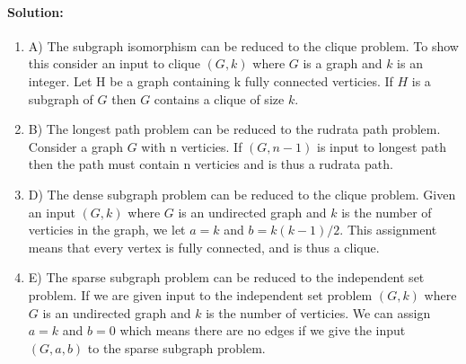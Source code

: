 \documentclass[12pt]{article}
\begin{document}
\paragraph{Solution:}
\begin{enumerate}

\item A) The subgraph isomorphism can be reduced to the clique problem.  To show
this consider an input to clique $(G,k)$ where $G$ is a graph and $k$ is an integer.
Let H be a graph containing k fully connected verticies.  If $H$ is a subgraph of
$G$ then $G$ contains a clique of size $k$.

\item B) The longest path problem can be reduced to the rudrata path problem.
Consider a graph $G$ with n verticies. If $(G,n-1)$ is input to longest path then
the path must contain n verticies and is thus a rudrata path.

\item D) The dense subgraph problem can be reduced to the clique problem. Given
an input $(G,k)$ where $G$ is an undirected graph and $k$ is the number of verticies
in the graph, we let $a=k$ and $b=k(k-1)/2$.  This assignment means that every
vertex is fully connected, and is thus a clique.

\item E) The sparse subgraph problem can be reduced to the independent set
problem. If we are given input to the independent set problem $(G,k)$ where
$G$ is an undirected graph and $k$ is the number of verticies.  We can assign
$a=k$ and $b=0$ which means there are no edges if we give the input $(G,a,b)$
to the sparse subgraph problem.

\end{enumerate}
\end{document}
